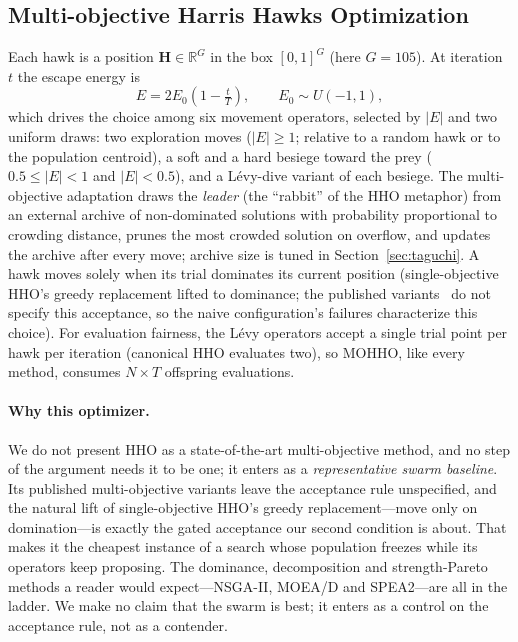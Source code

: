 \documentclass[runningheads]{llncs}
\begin{document}
\subsection{Multi-objective Harris Hawks Optimization}
\label{sec:mohho}

Each hawk is a position $\mathbf{H}\in\mathbb{R}^{G}$ in the box $[0,1]^{G}$ (here $G=105$). At iteration $t$ the escape energy is
\begin{equation}
E = 2E_0\!\left(1 - \tfrac{t}{T}\right), \qquad E_0 \sim U(-1,1),
\label{eq:energy}
\end{equation}
which drives the choice among six movement operators, selected by $|E|$ and two uniform draws: two exploration moves ($|E|\ge1$; relative to a random hawk or to the population centroid), a soft and a hard besiege toward the prey ($0.5\le|E|<1$ and $|E|<0.5$), and a L\'evy-dive variant of each besiege. The multi-objective adaptation draws the \emph{leader} (the ``rabbit'' of the HHO metaphor) from an external archive of non-dominated solutions with probability proportional to crowding distance, prunes the most crowded solution on overflow, and updates the archive after every move; archive size is tuned in Section~\ref{sec:taguchi}. A hawk moves solely when its trial dominates its current position (single-objective HHO's greedy replacement lifted to dominance; the published variants~\cite{jangir,cerci,kusoglu} do not specify this acceptance, so the naive configuration's failures characterize this choice). For evaluation fairness, the L\'evy operators accept a single trial point per hawk per iteration (canonical HHO evaluates two), so MOHHO, like every method, consumes $N\times T$ offspring evaluations.

\paragraph{Why this optimizer.}
We do not present HHO as a state-of-the-art multi-objective method, and no step of the argument needs it to be one; it enters as a \emph{representative swarm baseline}. Its published multi-objective variants leave the acceptance rule unspecified, and the natural lift of single-objective HHO's greedy replacement---move only on domination---is exactly the gated acceptance our second condition is about. That makes it the cheapest instance of a search whose population freezes while its operators keep proposing. The dominance, decomposition and strength-Pareto methods a reader would expect---NSGA-II, MOEA/D and SPEA2---are all in the ladder. We make no claim that the swarm is best; it enters as a control on the acceptance rule, not as a contender.
\end{document}
